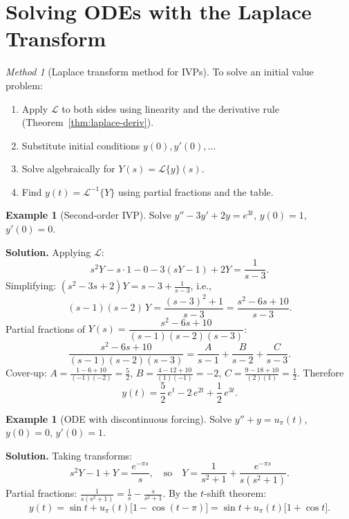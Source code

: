 \documentclass[12pt,a4paper,openany]{book}
\theoremstyle{definition}
\newtheorem{example}[definition]{Example}
\theoremstyle{plain}
\theoremstyle{remark}
\newtheorem{method}[definition]{Method}
\begin{document}
\section{Solving ODEs with the Laplace Transform}
\label{sec:laplace-solve-ode}

\begin{method}[Laplace transform method for IVPs]
\label{meth:laplace-ivp}
To solve an initial value problem:
\begin{enumerate}[label=\textbf{Step~\arabic*.}]
  \item Apply \(\mathcal{L}\) to both sides using linearity and the derivative
    rule (Theorem~\ref{thm:laplace-deriv}).
  \item Substitute initial conditions \(y(0),y'(0),\ldots\)
  \item Solve algebraically for \(Y(s)=\mathcal{L}\{y\}(s)\).
  \item Find \(y(t)=\mathcal{L}^{-1}\{Y\}\) using partial fractions and the
    table.
\end{enumerate}
\end{method}

\begin{example}[Second-order IVP]
\label{ex:laplace-2nd-order}
Solve \(y''-3y'+2y=e^{3t}\), \(y(0)=1\), \(y'(0)=0\).

\medskip\noindent\textbf{Solution.}
Applying \(\mathcal{L}\):
\[
  s^2 Y - s\cdot 1 - 0 - 3(sY - 1) + 2Y = \frac{1}{s-3}.
\]
Simplifying: \((s^2-3s+2)Y = s - 3 + \frac{1}{s-3}\), i.e.,
\[
  (s-1)(s-2)\,Y = \frac{(s-3)^2+1}{s-3} = \frac{s^2-6s+10}{s-3}.
\]
Partial fractions of \(Y(s)=\dfrac{s^2-6s+10}{(s-1)(s-2)(s-3)}\):
\[
  \frac{s^2-6s+10}{(s-1)(s-2)(s-3)}
  = \frac{A}{s-1}+\frac{B}{s-2}+\frac{C}{s-3}.
\]
Cover-up: \(A=\frac{1-6+10}{(-1)(-2)}=\frac{5}{2}\),
\(B=\frac{4-12+10}{(1)(-1)}=-2\),
\(C=\frac{9-18+10}{(2)(1)}=\frac{1}{2}\).
Therefore
\[
  y(t) = \frac{5}{2}\,e^t - 2\,e^{2t} + \frac{1}{2}\,e^{3t}.
\]
\end{example}

\begin{example}[ODE with discontinuous forcing]
\label{ex:laplace-discontinuous}
Solve \(y''+y=u_\pi(t)\), \(y(0)=0\), \(y'(0)=1\).

\medskip\noindent\textbf{Solution.}
Taking transforms:
\[
  s^2Y - 1 + Y = \frac{e^{-\pi s}}{s},
  \quad\text{so}\quad
  Y = \frac{1}{s^2+1} + \frac{e^{-\pi s}}{s(s^2+1)}.
\]
Partial fractions: \(\frac{1}{s(s^2+1)}=\frac{1}{s}-\frac{s}{s^2+1}\). By
the \(t\)-shift theorem:
\[
  y(t) = \sin t + u_\pi(t)\bigl[1-\cos(t-\pi)\bigr]
       = \sin t + u_\pi(t)\bigl[1+\cos t\bigr].
\]
\end{example}
\end{document}
